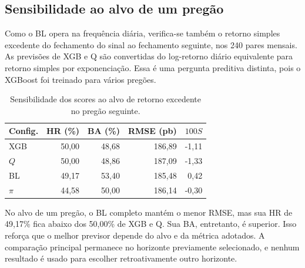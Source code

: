 \subsection{Sensibilidade ao alvo de um pregão}

Como o BL opera na frequência diária, verifica-se também o retorno simples excedente do fechamento do sinal ao fechamento seguinte, nos 240 pares mensais. As previsões de XGB e Q são convertidas do log-retorno diário equivalente para retorno simples por exponenciação. Essa é uma pergunta preditiva distinta, pois o XGBoost foi treinado para vários pregões.

\begin{table}[H]\centering
\caption{Sensibilidade dos scores ao alvo de retorno excedente no pregão seguinte.}
\label{tab:scores_pregao_seguinte}
{\footnotesize\setlength{\tabcolsep}{4pt}\begin{tabular}{lrrrr}\hline
Config. & HR (\%) & BA (\%) & RMSE (pb) & $100S$\\ \hline
XGB & 50,00 & 48,68 & 186,89 & -1,11\\
$Q$ & 50,00 & 48,86 & 187,09 & -1,33\\
BL & 49,17 & 53,40 & 185,48 & 0,42\\
$\pi$ & 44,58 & 50,00 & 186,14 & -0,30\\
\hline\end{tabular}}
\par{}
\end{table}

No alvo de um pregão, o BL completo mantém o menor RMSE, mas sua HR de 49,17\% fica abaixo dos 50,00\% de XGB e Q. Sua BA, entretanto, é superior. Isso reforça que o melhor previsor depende do alvo e da métrica adotados. A comparação principal permanece no horizonte previamente selecionado, e nenhum resultado é usado para escolher retroativamente outro horizonte.
